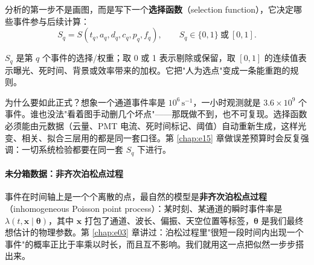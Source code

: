 分析的第一步不是画图，而是写下一个\textbf{选择函数}（selection function），它决定哪些事件参与后续计算：
\begin{equation}
  S_q = S(t_q,a_q,d_q,c_q,p_q,f_q),
  \qquad
  S_q\in\{0,1\}\ \text{或}\ [0,1] .
  \label{eq:e14-selection}
\end{equation}
\begin{formulaexplain}
\(S_q\) 是第 \(q\) 个事件的选择/权重；取 0 或 1 表示剔除或保留，取 \([0,1]\) 的连续值表示曝光、死时间、背景或效率带来的加权。它把"人为选点"变成一条能重跑的规则。
\end{formulaexplain}
为什么要如此正式？想象一个通道事件率是 \(10^{6}\,\mathrm{s^{-1}}\)，一小时观测就是 \(3.6\times10^{9}\) 个事件。谁也没法"看着图手动删几个坏点"——那既做不到，也不可复现。选择函数必须能由元数据（云量、PMT 电流、死时间标记、阈值）自动重新生成，这样光变、相关、拟合三层用的都是同一套口径。第 \ref{chap:e15} 章做误差预算时会反复强调：一切系统检验都要在同一套 \(S_q\) 下进行。

\paragraph{未分箱数据：非齐次泊松点过程}

事件在时间轴上是一个个离散的点，最自然的模型是\textbf{非齐次泊松点过程}（inhomogeneous Poisson point process）：某时刻、某通道的瞬时事件率是 \(\lambda(t,\bm{x}\mid\bm{\theta})\)，其中 \(\bm x\) 打包了通道、波长、偏振、天空位置等标签，\(\bm\theta\) 是我们最终想估计的物理参数。第 \ref{chap:e03} 章讲过：泊松过程里"很短一段时间内出现一个事件"的概率正比于率乘以时长，而且互不影响。我们就用这一点把似然一步步搭出来。

